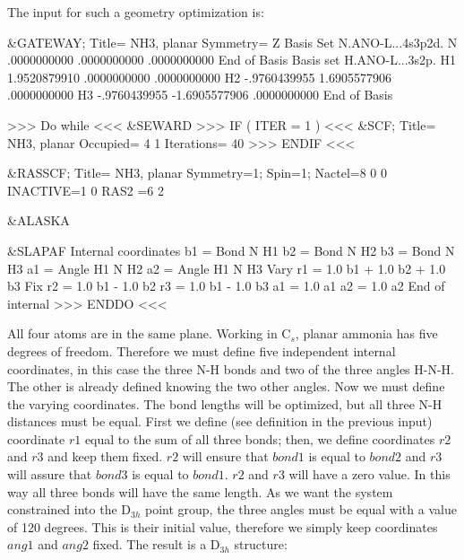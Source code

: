 The input for such a geometry optimization is:

\begin{inputlisting}
 &GATEWAY; Title= NH3, planar
   Symmetry= Z
   Basis Set
   N.ANO-L...4s3p2d.
   N               .0000000000         .0000000000         .0000000000
   End of Basis
   Basis set
   H.ANO-L...3s2p.
   H1             1.9520879910         .0000000000         .0000000000
   H2             -.9760439955        1.6905577906         .0000000000
   H3             -.9760439955       -1.6905577906         .0000000000
   End of Basis

>>> Do while <<<
 &SEWARD
>>> IF ( ITER = 1 ) <<<
 &SCF; Title= NH3, planar
   Occupied= 4 1
   Iterations= 40
>>> ENDIF <<<

 &RASSCF; Title= NH3, planar
   Symmetry=1; Spin=1; Nactel=8  0  0
   INACTIVE=1 0
   RAS2    =6 2

 &ALASKA

 &SLAPAF
Internal coordinates
b1 = Bond N H1
b2 = Bond N H2
b3 = Bond N H3
a1 = Angle H1 N H2
a2 = Angle H1 N H3
Vary
  r1 = 1.0 b1 + 1.0 b2 + 1.0 b3
Fix
  r2 = 1.0 b1 - 1.0 b2
  r3 = 1.0 b1 - 1.0 b3
  a1 = 1.0 a1
  a2 = 1.0 a2
End of internal
>>> ENDDO <<<
\end{inputlisting}

All four atoms are in the same plane.
Working in C$_s$, planar ammonia has five degrees of freedom.
Therefore we must define five independent internal coordinates, in this
case the three N-H bonds and two of the three angles H-N-H. The
other is already defined knowing the two other angles. 
Now we must define the varying coordinates. The bond lengths will
be optimized, but all three N-H distances must be equal. 
First we define (see definition in the previous input)
coordinate $r1$ equal to the sum of all three
bonds; then, we define coordinates $r2$ and $r3$ and keep them fixed.
$r2$ will ensure that $bond1$ is equal to $bond2$ and $r3$ will assure that
$bond3$ is equal to $bond1$. $r2$ and $r3$ will have a zero value.
In this way all three bonds will have the same length. 
As we want the system constrained into the D$_{3h}$ point group, 
the three angles must be equal with a value of 120 degrees. This is
their initial value, therefore we simply keep coordinates $ang1$ and $ang2$
fixed.  The result is a D$_{3h}$ structure:

